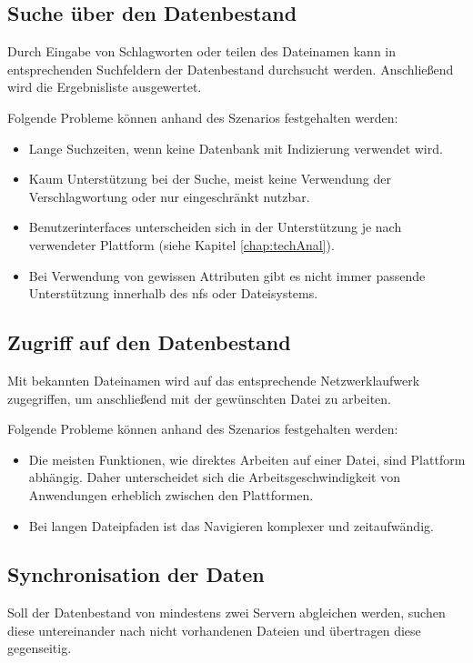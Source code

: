 \documentclass[oneside, ngerman, toc=bibliography,bibliography=totoc,listof=entryprefix, open=right,numbers=noenddot,fontsize=12pt]{scrbook}
\begin{document}
\subsection*{Suche über den Datenbestand}
Durch Eingabe von Schlagworten oder teilen des Dateinamen kann in entsprechenden Suchfeldern der Datenbestand durchsucht werden. Anschließend wird die Ergebnisliste ausgewertet.

\bigskip
Folgende Probleme können anhand des Szenarios festgehalten werden:
\begin{itemize}
	\item Lange Suchzeiten, wenn keine Datenbank mit Indizierung verwendet wird.
	\item Kaum Unterstützung bei der Suche, meist keine Verwendung der Verschlagwortung oder nur eingeschränkt nutzbar. 
	\item Benutzerinterfaces unterscheiden sich in der Unterstützung je nach verwendeter Plattform (siehe Kapitel \ref{chap:techAnal}).
	\item Bei Verwendung von gewissen Attributen gibt es nicht immer passende Unterstützung innerhalb des \acrshort{nfs} oder Dateisystems.
\end{itemize}

\subsection*{Zugriff auf den Datenbestand}
Mit bekannten Dateinamen wird auf das entsprechende Netzwerklaufwerk zugegriffen, um anschließend mit der gewünschten Datei zu arbeiten.

\bigskip
Folgende Probleme können anhand des Szenarios festgehalten werden:
\begin{itemize}
	\item Die meisten Funktionen, wie direktes Arbeiten auf einer Datei, sind Plattform abhängig. Daher unterscheidet sich die Arbeitsgeschwindigkeit von Anwendungen erheblich zwischen den Plattformen.
	\item Bei langen Dateipfaden ist das Navigieren komplexer und zeitaufwändig.
\end{itemize}


\subsection*{Synchronisation der Daten}
Soll der Datenbestand von mindestens zwei Servern abgleichen werden, suchen diese untereinander nach nicht vorhandenen Dateien und übertragen diese gegenseitig.
\end{document}
